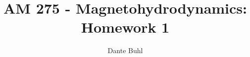 \documentclass{article}
\begin{document}
\doublespacing

\title{AM 275 - Magnetohydrodynamics: Homework 1}
\author{Dante Buhl}


\newcommand{\wrms}{w_{\text{rms}}}
\newcommand{\bs}[1]{\boldsymbol{#1}}
\newcommand{\tb}[1]{\textbf{#1}}
\newcommand{\bmp}[1]{\begin{minipage}{#1\textwidth}}
\newcommand{\emp}{\end{minipage}}
\newcommand{\R}{\mathbb{R}}
\newcommand{\C}{\mathbb{C}}
\newcommand{\N}{\mathcal{N}}
\newcommand{\K}{\bs{\mathrm{K}}}
\newcommand{\m}{\bs{\mu}_*}
\newcommand{\s}{\bs{\Sigma}_*}
\newcommand{\dt}{\Delta t}
\newcommand{\dx}{\Delta x}
\newcommand{\tr}[1]{\text{Tr}(#1)}
\newcommand{\Tr}[1]{\text{Tr}(#1)}
\newcommand{\Div}{\nabla \cdot}
\renewcommand{\div}{\nabla \cdot}
\newcommand{\Curl}{\nabla \times}
\newcommand{\Grad}{\nabla}
\newcommand{\grad}{\nabla}
\newcommand{\grads}{\nabla_s}
\newcommand{\gradf}{\nabla_f}
\newcommand{\xs}{x_s}
\newcommand{\xf}{x_f}
\newcommand{\ts}{t_s}
\newcommand{\tf}{t_f}
\newcommand{\pt}{\partial t}
\newcommand{\pz}{\partial z}
\newcommand{\uvec}{\bs{u}}
\newcommand{\bvec}{\bs{B}}
\newcommand{\jvec}{\bs{j}}
\newcommand{\F}{\bs{F}}
\newcommand{\B}{\bs{B}}
\newcommand{\E}{\bs{E}}
\newcommand{\T}{\tilde{T}}
\newcommand{\ez}{\bs{e}_z}
\newcommand{\ex}{\bs{e}_x}
\newcommand{\ey}{\bs{e}_y}
\newcommand{\eo}{\bs{e}_{\bs{\Omega}}}
\newcommand{\ppt}[1]{\frac{\partial #1}{\partial t}}
\newcommand{\DDt}[1]{\frac{D #1}{D t}}
\newcommand{\ppts}[1]{\frac{\partial #1}{\partial t_s}}
\newcommand{\pptf}[1]{\frac{\partial #1}{\partial t_f}}
\newcommand{\ppz}[1]{\frac{\partial #1}{\partial z}}
\newcommand{\ddz}[1]{\frac{d #1}{d z}}
\newcommand{\ppzetas}[1]{\frac{\partial^2 #1}{\partial \zeta^2}}
\newcommand{\ppzs}[1]{\frac{\partial #1}{\partial z_s}}
\newcommand{\ppzf}[1]{\frac{\partial #1}{\partial z_f}}
\newcommand{\ppx}[1]{\frac{\partial #1}{\partial x}}
\newcommand{\ppxi}[1]{\frac{\partial #1}{\partial x_i}}
\newcommand{\ppxj}[1]{\frac{\partial #1}{\partial x_j}}
\newcommand{\ppxm}[1]{\frac{\partial #1}{\partial x_m}}
\newcommand{\ppy}[1]{\frac{\partial #1}{\partial y}}
\newcommand{\ppzeta}[1]{\frac{\partial #1}{\partial \zeta}}


\maketitle 
\setlength{\parindent}{0pt}

\section{}
\end{document}
